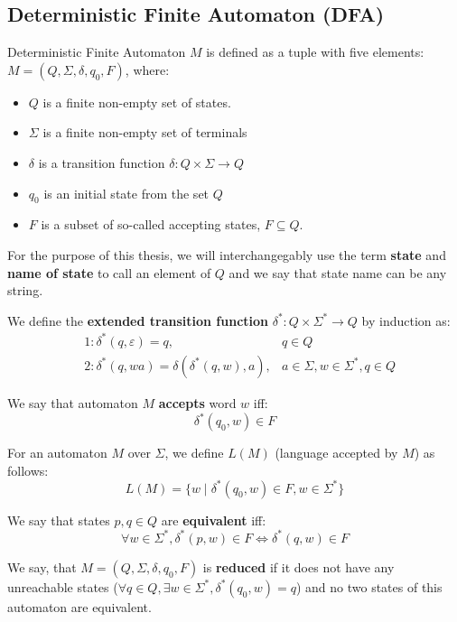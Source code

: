 \documentclass{ctuthesis}
\begin{document}
\subsection{Deterministic Finite Automaton (DFA)}
Deterministic Finite Automaton $M$ is defined as a tuple with five elements: $M = (Q, \Sigma, \delta, q_0, F)$, where:
\begin{itemize}
	\item $Q$ is a finite non-empty set of states.
	\item $\Sigma$ is a finite non-empty set of terminals
	\item $\delta$ is a transition function $\delta : Q \times \Sigma \rightarrow Q$
	\item $q_0$ is an initial state from the set $Q$
	\item $F$ is a subset of so-called accepting states, $F \subseteq Q$.
\end{itemize}

For the purpose of this thesis, we will interchangegably use the term \textbf{state} and \textbf{name of state} to call an element of $Q$ and we say that state name can be any string.

We define the \textbf{extended transition function} $\delta^* : Q \times \Sigma^* \rightarrow Q$ by induction as:  
\begin{align*}
	&1: \delta^*(q, \varepsilon) = q, &q \in Q \\
	&2: \delta^*(q, wa) = \delta(\delta^*(q, w), a), &a \in \Sigma, w \in \Sigma^*, q \in Q
\end{align*}

We say that automaton $M$ \textbf{accepts} word $w$ iff:
\begin{equation*}
	\delta^*(q_0, w) \in F
\end{equation*}


For an automaton $M$ over $\Sigma$, we define $L(M)$ (language accepted by $M$) as follows:
\begin{equation*}
	L(M) = \{w \mid \delta^*(q_0, w) \in F, w \in \Sigma^*\}
\end{equation*}

We say that states $p, q \in Q$ are \textbf{equivalent} iff:
\begin{equation*}
\forall w \in \Sigma^*, \delta^*(p, w) \in F \iff \delta^*(q, w) \in F
\end{equation*}

We say, that $M = (Q, \Sigma, \delta, q_0, F)$ is \textbf{reduced} if it does not have any unreachable states ($\forall q \in Q, \exists w \in \Sigma^*, \delta^*(q_0, w) = q$) and no two states of this automaton are equivalent.
\end{document}
